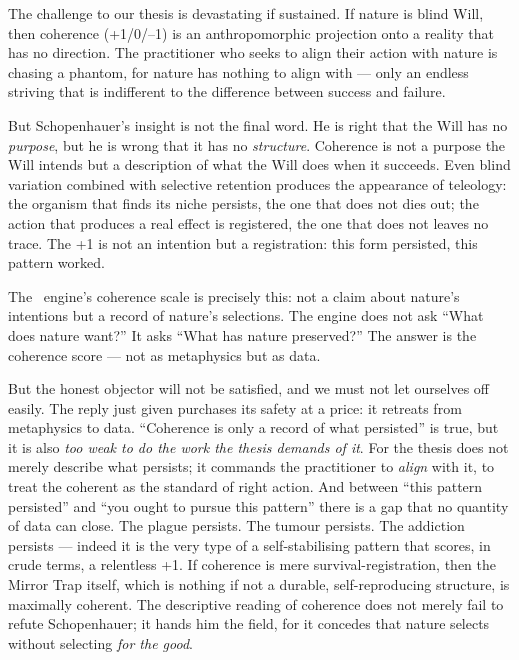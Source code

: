 The challenge to our thesis is devastating if sustained. If nature is blind Will,
then coherence (+1/0/--1) is an anthropomorphic projection onto a reality that
has no direction. The practitioner who seeks to align their action with nature
is chasing a phantom, for nature has nothing to align with --- only an endless
striving that is indifferent to the difference between success and failure.

But Schopenhauer's insight is not the final word. He is right that the Will has
no \emph{purpose}, but he is wrong that it has no \emph{structure}. Coherence
is not a purpose the Will intends but a description of what the Will does when
it succeeds. Even blind variation combined with selective retention produces the
appearance of teleology: the organism that finds its niche persists, the one
that does not dies out; the action that produces a real effect is registered,
the one that does not leaves no trace. The +1 is not an intention but a
registration: this form persisted, this pattern worked.

The \physis\ engine's coherence scale is precisely this: not a claim about
nature's intentions but a record of nature's selections. The engine does not ask
``What does nature want?'' It asks ``What has nature preserved?'' The answer
is the coherence score --- not as metaphysics but as data.

But the honest objector will not be satisfied, and we must not let ourselves off
easily. The reply just given purchases its safety at a price: it retreats from
metaphysics to data. ``Coherence is only a record of what persisted'' is true,
but it is also \emph{too weak to do the work the thesis demands of it}. For the
thesis does not merely describe what persists; it commands the practitioner to
\emph{align} with it, to treat the coherent as the standard of right action. And
between ``this pattern persisted'' and ``you ought to pursue this pattern'' there
is a gap that no quantity of data can close. The plague persists. The tumour
persists. The addiction persists --- indeed it is the very type of a self-stabilising
pattern that scores, in crude terms, a relentless +1. If coherence is mere
survival-registration, then the Mirror Trap itself, which is nothing if not a
durable, self-reproducing structure, is maximally coherent. The descriptive
reading of coherence does not merely fail to refute Schopenhauer; it hands him
the field, for it concedes that nature selects without selecting \emph{for the
good}.

